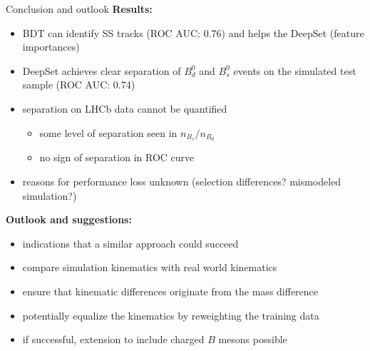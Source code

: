 \documentclass[aspectratio=1610, 10pt]{beamer}
\begin{document}
\begin{frame}{Conclusion and outlook}
  \textbf{Results:}
  \begin{itemize}
    \item BDT can identify SS tracks (ROC AUC: 0.76) and helps the DeepSet (feature importances)
    \item DeepSet achieves clear separation of $B^0_d$ and $B^0_s$ events on the simulated test sample (ROC AUC: 0.74)
    \item separation on LHCb data cannot be quantified
    \begin{itemize}
      \item some level of separation seen in $n_{B_s}/n_{B_d}$
      \item no sign of separation in ROC curve
    \end{itemize}
    \item reasons for performance loss unknown (selection differences? mismodeled simulation?)
  \end{itemize}
  
  \medskip
  \textbf{Outlook and suggestions:}
  \begin{itemize}
    \item indications that a similar approach could succeed
    \item compare simulation kinematics with real world kinematics
    \item ensure that kinematic differences originate from the mass difference
    \item potentially equalize the kinematics by reweighting the training data
    \item if successful, extension to include charged $B$ mesons possible
  \end{itemize}
\end{frame}
\end{document}
